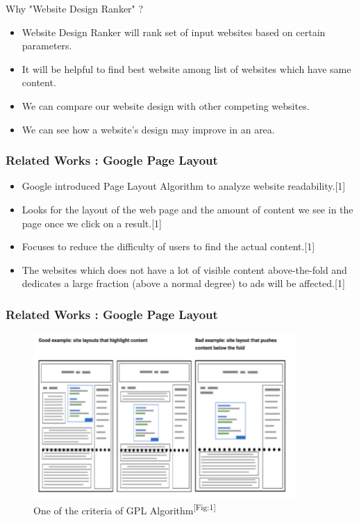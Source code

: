 \documentclass[11pt]{beamer}
\begin{document}
	\begin{frame}{Why "Website Design Ranker" ?}
			\begin{itemize}
			\item Website Design Ranker will rank set of input websites based on certain parameters.
			\item It will be helpful to find best website among list of websites which have same content.
			\item We can compare our website design with other competing websites.
			\item We can see how a website's design may improve in an area.

			\end{itemize}
	\end{frame}
	\begin{frame}
	\frametitle{{Related Works : Google Page Layout}}
	\begin{itemize}
		\item Google introduced Page Layout Algorithm to analyze website readability.[1]
		\item Looks for the layout of the web page and the amount of content we see in the page once we click on a result.[1]
		
		\item Focuses to reduce the difficulty of users to find the actual content.[1]
		
		\item  The websites which does not have a lot of visible content above-the-fold and dedicates a large fraction (above a normal degree) to ads will be affected.[1]
		
		
	\end{itemize}

	\end{frame}
	\begin{frame}
\frametitle{{Related Works : Google Page Layout}}
\begin{figure}
	
	\includegraphics[width=10cm]{image/gpa.png}
	\caption{One of the criteria of GPL Algorithm\textsuperscript{[Fig:1]}}
	\label{fig1:gpa}
\end{figure}
\end{frame}
\end{document}
